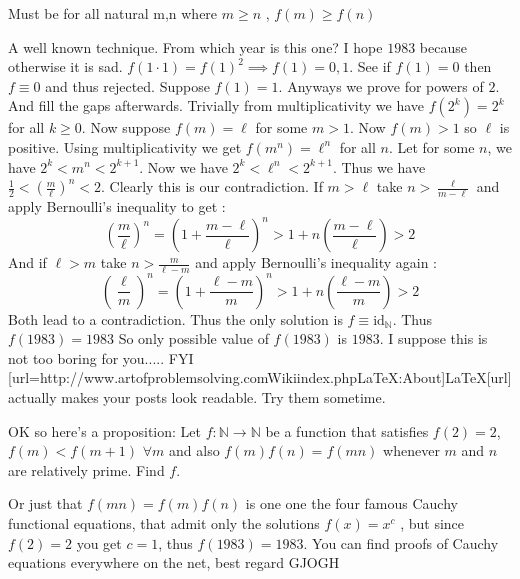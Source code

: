 \begin{solution}
	Must be for all natural m,n where $ m \geq n $  , $ f(m)\geq f(n)$
\end{solution}



\begin{solution}
	A well known technique. From which year is this one? I hope $1983$ because otherwise it is sad. 
$f(1\cdot 1)=f(1)^2\implies f(1)=0,1$. See if $f(1)=0$ then $f\equiv 0$ and thus rejected. Suppose $f(1)=1$. Anyways we prove for powers of $2$. And fill the gaps afterwards. Trivially from multiplicativity we have $f(2^k)=2^k$ for all $k\ge 0$. Now suppose $f(m)=\ell$ for some $m>1$. Now $f(m)>1$ so $\ell$ is positive. Using multiplicativity we get $f(m^n)=\ell^n$ for all $n$. Let for some $n$, we have $2^k<m^n<2^{k+1}$. Now we have $2^k<\ell^n<2^{k+1}$. Thus we have $\frac{1}{2}<\left(\frac{m}{\ell}\right)^n<2$. Clearly this is our contradiction. If $m>\ell$ take $n>\frac{\ell}{m-\ell}$ and apply Bernoulli's inequality to get :
\[ \left(\frac{m}{\ell}\right)^n=\left(1+\frac{m-\ell}{\ell}\right)^n>1+n\left(\frac{m-\ell}{\ell}\right)>2 \]
And if $\ell>m$ take $n>\frac{m}{\ell-m}$ and apply Bernoulli's inequality again :
\[ \left(\frac{\ell}{m}\right)^n=\left(1+\frac{\ell-m}{m}\right)^n>1+n\left(\frac{\ell-m}{m}\right)>2 \]
Both lead to a contradiction. Thus the only solution is $f\equiv \text{id}_{\mathbb{N}}$. Thus $f(1983)=1983$
So only possible value of $f(1983)$ is $1983$. I suppose this is not too boring for you.....
FYI [url=http://www.artofproblemsolving.com\/Wiki\/index.php\/LaTeX:About]LaTeX[\/url] actually makes your posts look readable. Try them sometime.
\end{solution}



\begin{solution}
	OK so here's a proposition:
Let $f:\mathbb{N}\to\mathbb{N}$ be a function that satisfies $f(2)=2$, $f(m)<f(m+1)$ $\forall m$ and also $f(m)f(n)=f(mn)$ whenever $m$ and $n$ are relatively prime. Find $f$.
\end{solution}



\begin{solution}
	Or just that $ f(mn)=f(m)f(n) $ is one one the four famous Cauchy functional equations, that admit only the solutions $ f(x)=x^c $ , but since $ f(2)=2 $ you get $ c=1 $, thus $ f(1983)=1983 $.
You can find proofs of Cauchy equations everywhere on the net, best regard 
GJOGH
\end{solution}



